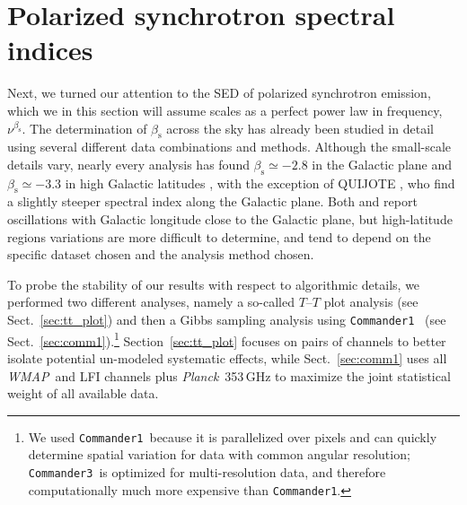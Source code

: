 \documentclass[twocolumn]{../../common/aa}
\def\WMAP{\emph{WMAP}}
\def\Planck{\emph{Planck}}
\def\commanderone{\texttt{Commander1}}
\def\commanderthree{\texttt{Commander3}}
\begin{document}
\section{Polarized synchrotron spectral indices}
\label{sec:specvar}

Next, we turned our attention to the SED of polarized synchrotron emission, which we in this section will assume scales as a perfect power law in frequency, $\nu^{\beta_{\mathrm{s}}}$. The determination of $\beta_{\mathrm{s}}$ across the sky has already been studied in detail using several different data combinations and methods. Although the small-scale details vary, nearly every analysis has found $\beta_\mathrm s\simeq-2.8$ in the Galactic plane and $\beta_\mathrm s\simeq-3.3$ in high Galactic latitudes \citep{fuskeland2014,krachmalnicoff2018,fuskeland:2019,weiland:2022}, with the exception of QUIJOTE \citep{QUIJOTE_IV,QUIJOTE_VIII}, who find a slightly steeper spectral index along the Galactic plane.
Both \citet{fuskeland2014} and \citet{weiland:2022} report oscillations with Galactic longitude close to the Galactic plane, but high-latitude regions variations are more difficult to determine, and tend to depend on the specific dataset chosen and the analysis method chosen.


To probe the stability of our results with respect to algorithmic details, we performed two different analyses, namely a so-called $T$--$T$ plot analysis (see Sect.~\ref{sec:tt_plot}) and then a Gibbs sampling analysis using \commanderone\ \citep{eriksen2008} (see Sect.~\ref{sec:comm1}).\footnote{We used \commanderone\ because it is parallelized over pixels and can quickly determine spatial variation for data with common angular resolution; \commanderthree\ is optimized for multi-resolution data, and therefore computationally much more expensive than \commanderone.} Section~\ref{sec:tt_plot} focuses on pairs of channels to better isolate potential un-modeled systematic effects, while Sect.~\ref{sec:comm1} uses all \WMAP\ and LFI channels plus \Planck\ 353\,GHz to maximize the joint statistical weight of all available data.
\end{document}

